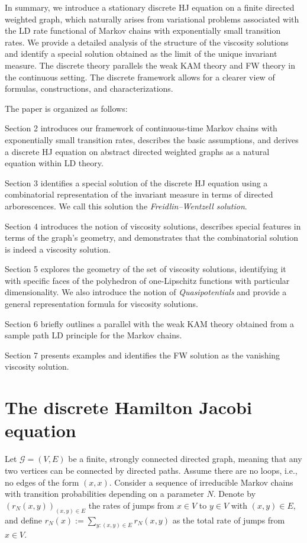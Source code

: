 \documentclass[reqno]{amsart}
\theoremstyle{plain}
\theoremstyle{definition}
\theoremstyle{remark}
\numberwithin{equation}{section}
\numberwithin{theorem}{section}
\newcommand{\<}{\langle}
\renewcommand{\>}{\rangle}
\begin{document}
\smallskip

In summary, we introduce a stationary discrete HJ equation on a finite directed weighted graph, which naturally arises from variational problems associated with the LD rate functional of Markov chains with exponentially small transition rates. We provide a detailed analysis of the structure of the viscosity solutions and identify a special solution obtained as the limit of the unique invariant measure. The discrete theory parallels the weak KAM theory and FW theory in the continuous setting. The discrete framework allows for a clearer view of formulas, constructions, and characterizations.



\smallskip
The paper is organized as follows:

Section 2 introduces our framework of continuous-time Markov chains with exponentially small transition rates, describes the basic assumptions, and derives a discrete HJ equation on abstract directed weighted graphs as a natural equation within LD theory.

Section 3 identifies a special solution of the discrete HJ equation using a combinatorial representation of the invariant measure in terms of directed arborescences. We call this solution the {\it Freidlin–Wentzell solution}.

Section 4 introduces the notion of viscosity solutions, describes special features in terms of the graph’s geometry, and demonstrates that the combinatorial solution is indeed a viscosity solution.

Section 5 explores the geometry of the set of viscosity solutions, identifying it with specific faces of the polyhedron of one-Lipschitz functions with particular dimensionality. We also introduce the notion of {\it Quasipotentials} and provide a general representation formula for viscosity solutions.

Section 6 briefly outlines a parallel with the weak KAM theory obtained from a sample path LD principle for the Markov chains.

Section 7 presents examples and identifies the FW solution as the vanishing viscosity solution.

\section{The discrete Hamilton Jacobi equation }\label{sec:frame}

Let $\mathcal{G} = (V, E)$ be a finite, strongly connected directed graph, meaning that any two vertices can be connected by directed paths. Assume there are no loops, i.e., no edges of the form $(x, x)$. Consider a sequence of irreducible Markov chains with transition probabilities depending on a parameter \(N\). Denote by \((r_N(x, y))_{(x, y) \in E}\) the rates of jumps from \(x \in V\) to \(y \in V\) with \((x, y) \in E\), and define \(r_N(x) := \sum_{y : (x, y) \in E} r_N(x, y)\) as the total rate of jumps from \(x \in V\).\\
\end{document}
